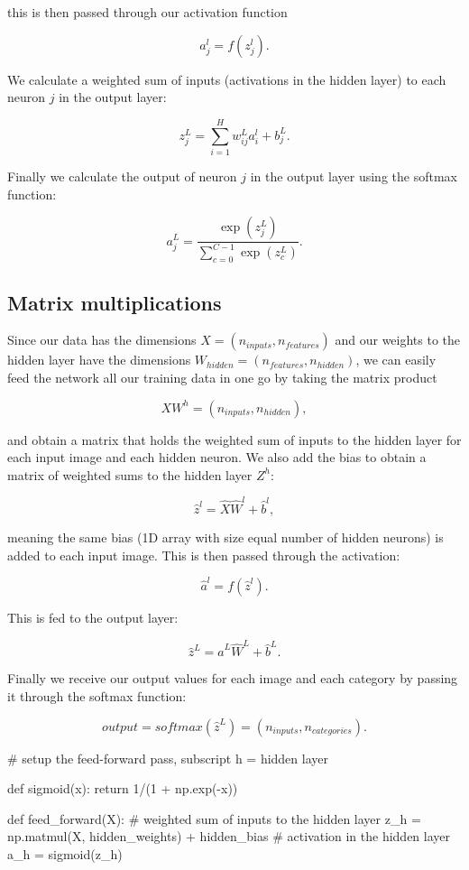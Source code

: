 \documentclass[%
oneside,                 %
final,                   %
10pt]{article}
\begin{document}
this is then passed through our activation function  

$$ a_{j}^{l} = f(z_{j}^{l}) .$$  

We calculate a weighted sum of inputs (activations in the hidden layer) to each neuron $j$ in the output layer:  

$$ z_{j}^{L} = \sum_{i=1}^{H} w_{ij}^{L} a_{i}^{l} + b_{j}^{L}.$$  

Finally we calculate the output of neuron $j$ in the output layer using the softmax function:  

$$ a_{j}^{L} = \frac{\exp{(z_j^{L})}}
{\sum_{c=0}^{C-1} \exp{(z_c^{L})}} .$$  

\subsection{Matrix multiplications}

Since our data has the dimensions $X = (n_{inputs}, n_{features})$ and our weights to the hidden
layer have the dimensions  
$W_{hidden} = (n_{features}, n_{hidden})$,
we can easily feed the network all our training data in one go by taking the matrix product  

$$ X W^{h} = (n_{inputs}, n_{hidden}),$$ 

and obtain a matrix that holds the weighted sum of inputs to the hidden layer
for each input image and each hidden neuron.    
We also add the bias to obtain a matrix of weighted sums to the hidden layer $Z^{h}$:  

$$ \hat{z}^{l} = \hat{X} \hat{W}^{l} + \hat{b}^{l} ,$$

meaning the same bias (1D array with size equal number of hidden neurons) is added to each input image.  
This is then passed through the activation:  

$$ \hat{a}^{l} = f(\hat{z}^l) .$$  

This is fed to the output layer:  

$$ \hat{z}^{L} = \hat{a}^{L} \hat{W}^{L} + \hat{b}^{L} .$$

Finally we receive our output values for each image and each category by passing it through the softmax function:  

$$ output = softmax (\hat{z}^{L}) = (n_{inputs}, n_{categories}) .$$


\bpycod
# setup the feed-forward pass, subscript h = hidden layer

def sigmoid(x):
    return 1/(1 + np.exp(-x))

def feed_forward(X):
    # weighted sum of inputs to the hidden layer
    z_h = np.matmul(X, hidden_weights) + hidden_bias
    # activation in the hidden layer
    a_h = sigmoid(z_h)
    
\end{document}
